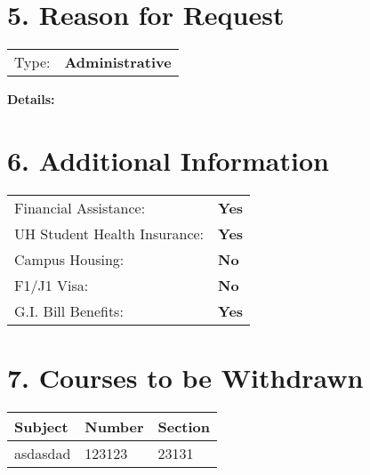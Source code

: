 \documentclass[12pt]{article}
\begin{document}
\vspace{0.5cm}

\section*{5. Reason for Request}
\begin{tabular}{ll}
Type: & \textbf{Administrative} \\
\end{tabular}

\noindent\textbf{Details:}\\

\vspace{0.5cm}

\section*{6. Additional Information}
\begin{tabular}{ll}
Financial Assistance: & \textbf{Yes} \\
UH Student Health Insurance: & \textbf{Yes} \\
Campus Housing: & \textbf{No} \\
F1/J1 Visa: & \textbf{No} \\
G.I. Bill Benefits: & \textbf{Yes} \\
\end{tabular}

\vspace{0.5cm}

\section*{7. Courses to be Withdrawn}
\begin{tabular}{lll}
\textbf{Subject} & \textbf{Number} & \textbf{Section} \\
\hline
asdasdad & 123123 & 23131 \\

\end{tabular}

\vspace{0.5cm}
\end{document}
